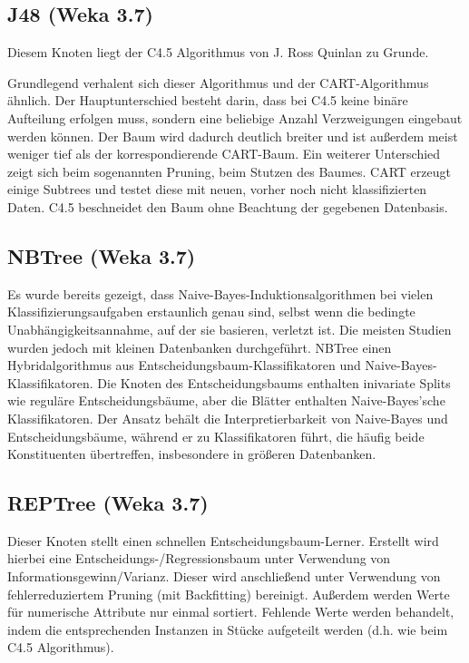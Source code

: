 \documentclass[12pt,					%
							 oneside,			%
							 a4paper,			%
							 halfparskip,		%
							 liststotoc,			%
							 bibtotoc,			%
							 fleqn,				%
							 pointlessnumbers]	%
							 {scrreprt}
\begin{document}
			
		\subsection{J48 (Weka 3.7)}
			Diesem Knoten liegt der C4.5 Algorithmus von J. Ross Quinlan zu Grunde.
			
			Grundlegend verhalent sich dieser Algorithmus und der CART-Algorithmus ähnlich. Der Hauptunterschied besteht darin, dass bei C4.5 keine binäre Aufteilung erfolgen muss, sondern eine beliebige Anzahl Verzweigungen eingebaut werden können. Der Baum wird dadurch deutlich breiter und ist außerdem meist weniger tief als der korrespondierende CART-Baum. Ein weiterer Unterschied zeigt sich beim sogenannten Pruning, beim Stutzen des Baumes. CART erzeugt einige Subtrees und testet diese mit neuen, vorher noch nicht klassifizierten Daten. C4.5 beschneidet den Baum ohne Beachtung der gegebenen Datenbasis.\cite{Salzberg1994}
			
			
		\subsection{NBTree (Weka 3.7)}
			Es wurde bereits gezeigt, dass Naive-Bayes-Induktionsalgorithmen bei vielen Klassifizierungsaufgaben erstaunlich genau sind, selbst wenn die bedingte Unabhängigkeitsannahme, auf der sie basieren, verletzt ist. Die meisten Studien wurden jedoch mit kleinen Datenbanken durchgeführt. NBTree einen Hybridalgorithmus aus Entscheidungsbaum-Klassifikatoren und Naive-Bayes-Klassifikatoren. Die Knoten des Entscheidungsbaums enthalten inivariate Splits wie reguläre Entscheidungsbäume, aber die Blätter enthalten Naive-Bayes'sche Klassifikatoren. Der Ansatz behält die Interpretierbarkeit von Naive-Bayes und Entscheidungsbäume, während er zu Klassifikatoren führt, die häufig beide Konstituenten übertreffen, insbesondere in größeren Datenbanken.\cite{Kohavi1996}
						
		\subsection{REPTree (Weka 3.7)}
			Dieser Knoten stellt einen schnellen Entscheidungsbaum-Lerner. Erstellt wird hierbei eine Entscheidungs-/Regressionsbaum unter Verwendung von Informationsgewinn/Varianz. Dieser wird anschließend unter Verwendung von fehlerreduziertem Pruning (mit Backfitting) bereinigt. Außerdem werden Werte für numerische Attribute nur einmal sortiert. Fehlende Werte werden behandelt, indem die entsprechenden Instanzen in Stücke aufgeteilt werden (d.h. wie beim C4.5 Algorithmus).
		
\end{document}
